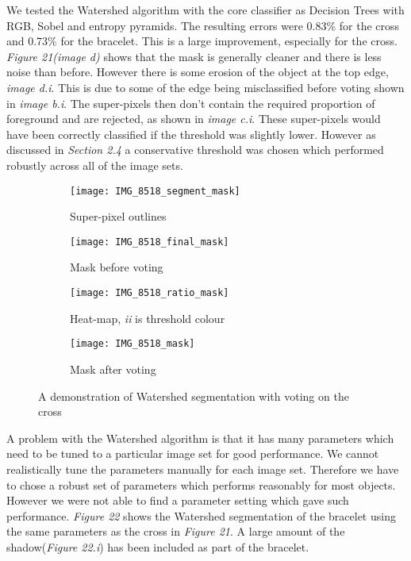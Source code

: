 \documentclass[12pt]{IIBproject}
\begin{document}
We tested the Watershed algorithm with the core classifier as Decision Trees with RGB, Sobel and entropy pyramids. The resulting errors were 0.83\% for the cross and 0.73\% for the bracelet. This is a large improvement, especially for the cross. \emph{Figure 21(image d)} shows that the mask is generally cleaner and there is less noise than before. However there is some erosion of the object at the top edge, \emph{image d.i}. This is due to some of the edge being misclassified before voting shown in \emph{image b.i}. The super-pixels then don't contain the required proportion of foreground and are rejected, as shown in \emph{image c.i}. These super-pixels would have been correctly classified if the threshold was slightly lower. However as discussed in \emph{Section 2.4} a conservative threshold was chosen which performed robustly across all of the image sets.
\begin{figure}[H]
\centering
\begin{subfigure}{.45\textwidth}
  \centering
  \texttt{[image: IMG\_8518\_segment\_mask]}
  \caption{Super-pixel outlines}
  \label{fig:sub1}
\end{subfigure}%
\begin{subfigure}{.45\textwidth}
  \centering
  \texttt{[image: IMG\_8518\_final\_mask]}
  \caption{Mask before voting}
  \label{fig:sub2}
\end{subfigure}
\begin{subfigure}{.45\textwidth}
  \centering
  \texttt{[image: IMG\_8518\_ratio\_mask]}
  \caption{Heat-map, \emph{ii} is threshold colour}
  \label{fig:sub2}
\end{subfigure}
\begin{subfigure}{.45\textwidth}
  \centering
  \texttt{[image: IMG\_8518\_mask]}
  \caption{Mask after voting}
  \label{fig:sub2}
\end{subfigure}
\caption{A demonstration of Watershed segmentation with voting on the cross}
\label{fig:test}
\end{figure}


A problem with the Watershed algorithm is that it has many parameters which need to be tuned to a particular image set for good performance. We cannot realistically tune the parameters manually for each image set. Therefore we have to chose a robust set of parameters which performs reasonably for most objects. However we were not able to find a parameter setting which gave such performance. \emph{Figure 22} shows the Watershed segmentation of the bracelet using the same parameters as the cross in \emph{Figure 21}. A large amount of the shadow(\emph{Figure 22.i}) has been included as part of the bracelet.
\end{document}
